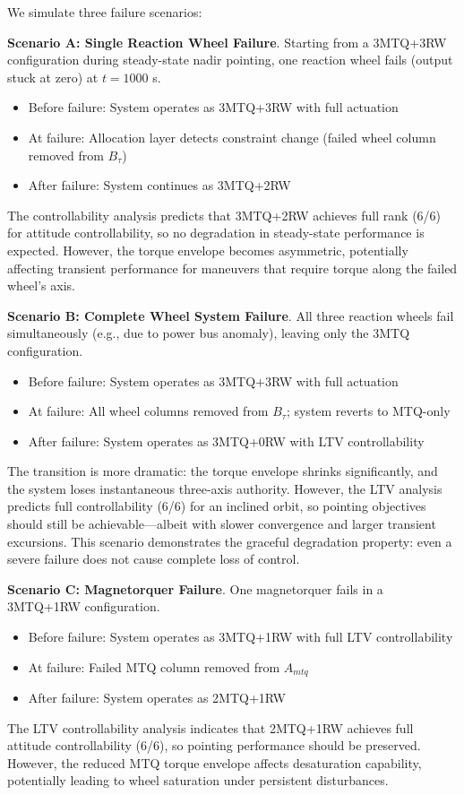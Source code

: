 \documentclass[conference]{IEEEtran}
\begin{document}
We simulate three failure scenarios:

\textbf{Scenario A: Single Reaction Wheel Failure}. Starting from a 3MTQ+3RW configuration during steady-state nadir pointing, one reaction wheel fails (output stuck at zero) at $t = 1000$ s.
\begin{itemize}
    \item Before failure: System operates as 3MTQ+3RW with full actuation
    \item At failure: Allocation layer detects constraint change (failed wheel column removed from $B_\tau$)
    \item After failure: System continues as 3MTQ+2RW
\end{itemize}
The controllability analysis predicts that 3MTQ+2RW achieves full rank (6/6) for attitude controllability, so no degradation in steady-state performance is expected. However, the torque envelope becomes asymmetric, potentially affecting transient performance for maneuvers that require torque along the failed wheel's axis.

\textbf{Scenario B: Complete Wheel System Failure}. All three reaction wheels fail simultaneously (e.g., due to power bus anomaly), leaving only the 3MTQ configuration.
\begin{itemize}
    \item Before failure: System operates as 3MTQ+3RW with full actuation
    \item At failure: All wheel columns removed from $B_\tau$; system reverts to MTQ-only
    \item After failure: System operates as 3MTQ+0RW with LTV controllability
\end{itemize}
The transition is more dramatic: the torque envelope shrinks significantly, and the system loses instantaneous three-axis authority. However, the LTV analysis predicts full controllability (6/6) for an inclined orbit, so pointing objectives should still be achievable---albeit with slower convergence and larger transient excursions. This scenario demonstrates the graceful degradation property: even a severe failure does not cause complete loss of control.

\textbf{Scenario C: Magnetorquer Failure}. One magnetorquer fails in a 3MTQ+1RW configuration.
\begin{itemize}
    \item Before failure: System operates as 3MTQ+1RW with full LTV controllability
    \item At failure: Failed MTQ column removed from $A_{mtq}$
    \item After failure: System operates as 2MTQ+1RW
\end{itemize}
The LTV controllability analysis indicates that 2MTQ+1RW achieves full attitude controllability (6/6), so pointing performance should be preserved. However, the reduced MTQ torque envelope affects desaturation capability, potentially leading to wheel saturation under persistent disturbances.
\end{document}
